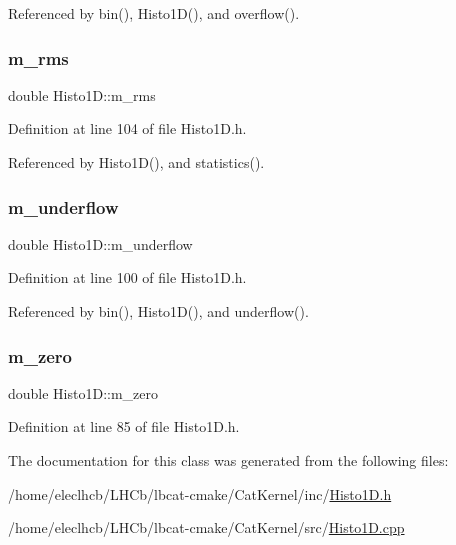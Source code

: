 Referenced by bin(), Histo1\+D(), and overflow().

\mbox{\label{classHisto1D_a1331c670df40eb18d8a814f5a15ec7da}} 
\subsubsection{\texorpdfstring{m\+\_\+rms}{m\_rms}}
{\footnotesize\ttfamily double Histo1\+D\+::m\+\_\+rms\hspace{0.3cm}{\ttfamily [private]}}



Definition at line 104 of file Histo1\+D.\+h.



Referenced by Histo1\+D(), and statistics().

\mbox{\label{classHisto1D_a7f475b822f4bbb23209e2e523d228380}} 
\subsubsection{\texorpdfstring{m\+\_\+underflow}{m\_underflow}}
{\footnotesize\ttfamily double Histo1\+D\+::m\+\_\+underflow\hspace{0.3cm}{\ttfamily [private]}}



Definition at line 100 of file Histo1\+D.\+h.



Referenced by bin(), Histo1\+D(), and underflow().

\mbox{\label{classHisto1D_ac87bd1971cc300ce6fc1e745785cacb9}} 
\subsubsection{\texorpdfstring{m\+\_\+zero}{m\_zero}}
{\footnotesize\ttfamily double Histo1\+D\+::m\+\_\+zero\hspace{0.3cm}{\ttfamily [private]}}



Definition at line 85 of file Histo1\+D.\+h.



The documentation for this class was generated from the following files\+:\begin{DoxyCompactItemize}
\item 
/home/eleclhcb/\+L\+H\+Cb/lbcat-\/cmake/\+Cat\+Kernel/inc/\hyperlink{Histo1D_8h}{Histo1\+D.\+h}\item 
/home/eleclhcb/\+L\+H\+Cb/lbcat-\/cmake/\+Cat\+Kernel/src/\hyperlink{Histo1D_8cpp}{Histo1\+D.\+cpp}\end{DoxyCompactItemize}

